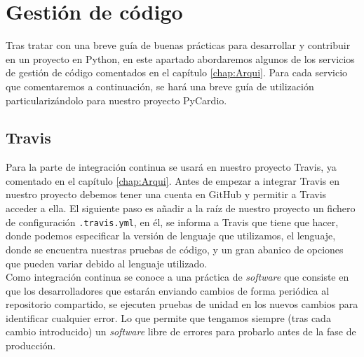 \section{Gestión de código}
\label{subsec:}
Tras tratar con una breve guía de buenas prácticas para desarrollar y contribuir en un proyecto en Python, en este apartado abordaremos algunos de los servicios de gestión de código comentados en el capítulo \ref{chap:Arqui}. Para cada servicio que comentaremos a continuación, se hará una breve guía de utilización particularizándolo para nuestro proyecto PyCardio.

\subsection*{Travis}
\label{subsubsec:Travis}
Para la parte de integración continua se usará en nuestro proyecto Travis, ya comentado en el capítulo \ref{chap:Arqui}. Antes de empezar a integrar Travis en nuestro proyecto debemos tener una cuenta en GitHub y permitir a Travis acceder a ella. El siguiente paso es añadir a la raíz de nuestro proyecto un fichero de configuración \texttt{.travis.yml}, en él, se informa a Travis que tiene que hacer, donde podemos especificar la versión de lenguaje que utilizamos, el lenguaje, donde se encuentra nuestras pruebas de código, y un gran abanico de opciones que pueden variar debido al lenguaje utilizado. \\

Como integración continua se conoce a una práctica de \emph{software} que consiste en que los desarrolladores que estarán enviando cambios de forma periódica al repositorio compartido, se ejecuten pruebas de unidad en los nuevos cambios para identificar cualquier error. Lo que permite que tengamos siempre (tras cada cambio introducido) un \emph{software} libre de errores para probarlo antes de la fase de producción. \\

